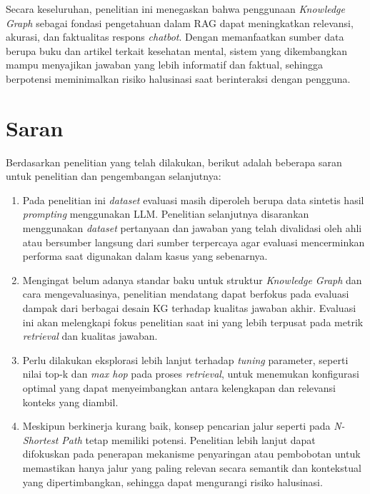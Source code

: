 Secara keseluruhan, penelitian ini menegaskan bahwa penggunaan \textit{Knowledge Graph} sebagai fondasi pengetahuan dalam RAG dapat meningkatkan relevansi, akurasi, dan faktualitas respons \textit{chatbot}.
Dengan memanfaatkan sumber data berupa buku dan artikel terkait kesehatan mental, sistem yang dikembangkan mampu menyajikan jawaban yang lebih informatif dan faktual, sehingga berpotensi meminimalkan risiko halusinasi saat berinteraksi dengan pengguna.

\section{Saran}
Berdasarkan penelitian yang telah dilakukan, berikut adalah beberapa saran untuk penelitian dan pengembangan selanjutnya:

\begin{enumerate}
      \item Pada penelitian ini \textit{dataset} evaluasi masih diperoleh berupa data sintetis hasil \textit{prompting} menggunakan LLM.
            Penelitian selanjutnya disarankan menggunakan \textit{dataset} pertanyaan dan jawaban yang telah divalidasi oleh ahli atau bersumber langsung dari sumber terpercaya agar evaluasi mencerminkan performa saat digunakan dalam kasus yang sebenarnya.

      \item Mengingat belum adanya standar baku untuk struktur \textit{Knowledge Graph} dan cara mengevaluasinya, penelitian mendatang dapat berfokus pada evaluasi dampak dari berbagai desain KG terhadap kualitas jawaban akhir.
            Evaluasi ini akan melengkapi fokus penelitian saat ini yang lebih terpusat pada metrik \textit{retrieval} dan kualitas jawaban.

      \item Perlu dilakukan eksplorasi lebih lanjut terhadap \textit{tuning} parameter, seperti nilai top-k dan \textit{max hop} pada proses \textit{retrieval}, untuk menemukan konfigurasi optimal yang dapat menyeimbangkan antara kelengkapan dan relevansi konteks yang diambil.

      \item Meskipun berkinerja kurang baik, konsep pencarian jalur seperti pada \textit{N-Shortest Path} tetap memiliki potensi.
            Penelitian lebih lanjut dapat difokuskan pada penerapan mekanisme penyaringan atau pembobotan untuk memastikan hanya jalur yang paling relevan secara semantik dan kontekstual yang dipertimbangkan, sehingga dapat mengurangi risiko halusinasi.

\end{enumerate}